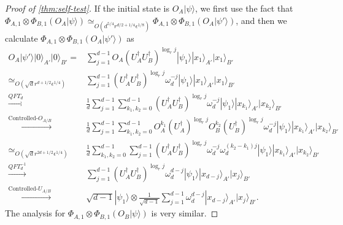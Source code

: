 \documentclass[11pt,letterpaper]{article}
\newcommand{\ket}[1]{|#1\rangle}
\newcommand{\x}{\otimes}
\newcommand{\ct}{^{\dagger}}
\newcommand{\1}{\mathbb{1}}
\newcommand{\ep}{\epsilon}
\newcommand{\sd}{\sqrt{d}}
\newcommand{\appd}[1]{\simeq_{#1}}
\theoremstyle{definition}
\begin{document}
\begin{proof}[Proof of \cref{thm:self-test}]
If the initial state is $O_A\ket{\psi}$, we first use the fact that 
$ \Phi_{A,1} \x \Phi_{B,1} (O_A\ket{\psi}) \appd{O(d^{5/4} r^{d/2+1/4} \ep^{1/8})}  \Phi_{A,1} \x \Phi_{B,1} (O_A\ket{\psi'})$, 
and then we calculate $\Phi_{A,1} \x \Phi_{B,1} (O_A\ket{\psi'})$ as
\begin{align}
	O_A \ket{\psi'} \ket{0}_{A'}\ket{0}_{B'} =&  
		\sum_{j=1}^{d-1} O_A(U_A\ct U_B\ct)^{\log_r j}\ket{\psi_1}\ket{x_1}_{A'}\ket{x_1}_{B'}\\
		\appd{O(\sd r^{d+1/2} \ep^{1/4})}&\sum_{j=1}^{d-1}(U_A\ct U_B\ct)^{\log_r j} \omega_d^{-j} \ket{\psi_1} \ket{x_1}_{A'}\ket{x_1}_{B'}\\
		\xrightarrow[]{QFT_d} &\frac{1}{d}\sum_{j=1}^{d-1} \sum_{k_1,k_2 = 0}^{d-1}(U_A\ct U_B\ct)^{\log_r j} \omega_d^{-j} 
		\ket{\psi_1}\ket{x_{k_1}}_{A'}\ket{x_{k_2}}_{B'}\\
		\xrightarrow[]{\text{Controlled-}O_{A/B}}&\frac{1}{d}\sum_{j=1}^{d-1}\sum_{k_1,k_2 = 0}^{d-1} 
		 O_A^{k_1}(U_A\ct)^{\log_r j} O_B^{k_2}(U_B\ct)^{\log_r j} \omega_d^{-j} \ket{\psi_1} 
		 \ket{x_{k_1}}_{A'}\ket{x_{k_2}}_{B'}\\
		\appd{O(\sd r^{2d+1/2}  \ep^{1/4})}& \frac{1}{d}\sum_{k_1,k_2 = 0}^{d-1} \sum_{j=1}^{d-1} (U_A\ct U_B\ct)^{\log_r j}
		\omega_d^{-j}\omega_d^{(k_2-k_1)j}\ket{\psi_1}
		 \ket{x_{k_1}}_{A'}\ket{x_{k_2}}_{B'}\\
		\xrightarrow[]{QFT_d^{-1}}& \sum_{j=1}^{d-1}  (U_A\ct U_B\ct)^{\log_r j}  
		\omega_d^{d-j}\ket{\psi_1} \ket{x_{d-j}}_{A'}\ket{x_j}_{B'}\\
		\xrightarrow[]{\text{Controlled-}U_{A/B}}&   \sqrt{d-1} \ket{\psi_1} \x  
		\frac{1}{\sqrt{d-1}}\sum_{j=1}^{d-1} \omega_d^{d-j}\ket{x_{d-j}}_{A'}\ket{x_j}_{B'}.
\end{align}
The analysis for $\Phi_{A,1} \x\Phi_{B,1} (O_B \ket{\psi})$ is very similar.


\end{proof}
\end{document}
